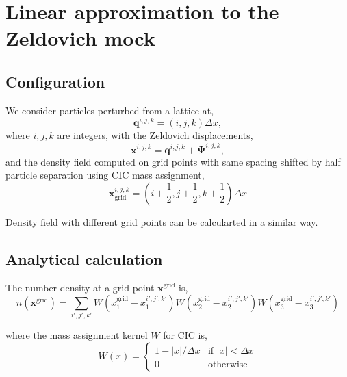 \documentclass[a4paper,11pt]{article}
\begin{document}
\section{Linear approximation to the Zeldovich mock}

\subsection{Configuration}

We consider particles perturbed from a lattice at,
\begin{equation}
  \bm{q}^{i,j,k} = (i, j, k) \Delta x,
\end{equation}
where $i, j, k$ are integers, with the Zeldovich displacements,
\begin{equation}
  \bm{x}^{i,j,k} = \bm{q}^{i,j,k} + \bm{\Psi}^{i,j,k},
\end{equation}
and the density field computed on grid points with same spacing
shifted by half particle separation using CIC mass assignment,
\begin{equation}
  \bm{x}_\mathrm{grid}^{i,j,k} =
    \left(i + \frac{1}{2}, j + \frac{1}{2}, k+\frac{1}{2} \right) \Delta x
\end{equation}

Density field with different grid points can be calcularted in a similar way.


\subsection{Analytical calculation}

The number density at a grid point $\bm{x}^\mathrm{grid}$ is,
\begin{equation}
  n(\bm{x}^\mathrm{grid}) =
  \sum_{i', j', k'} W(x^\mathrm{grid}_1 - x_1^{i', j', k'})
                  W(x^\mathrm{grid}_2 - x_2^{i', j', k'})
                  W(x^\mathrm{grid}_3 - x_3^{i', j', k'})
\end{equation}

where the mass assignment kernel $W$ for CIC is,
\begin{equation}
  W(x) = 
  \begin{cases}
  
    1 - |x|/\Delta x &\text{if } |x| < \Delta x\\
    0                & \text{otherwise}
  \end{cases}
\end{equation}
\end{document}
